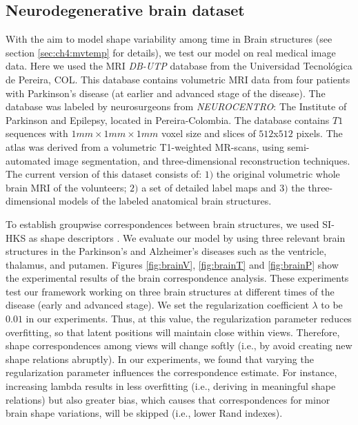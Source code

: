 \documentclass[]{article}
\begin{document}
\subsection{Neurodegenerative brain dataset}


With the aim to model shape variability among time in Brain structures (see section \ref{sec:ch4:mvtemp} for details), we test our model on real medical image data. Here  we used the MRI \textit{DB-UTP} database from the Universidad Tecnol\'ogica de Pereira, COL. This database contains volumetric MRI data from four patients with Parkinson's disease (at earlier and advanced stage of the disease). The database was labeled by neurosurgeons from \textit{NEUROCENTRO}: The Institute of Parkinson and Epilepsy, located in Pereira-Colombia. The database contains $T1$ sequences with $1mm\times1mm\times1mm$ voxel size and slices of $512$x$512$ pixels. The atlas was derived from a volumetric T1-weighted MR-scans, using semi-automated image segmentation, and three-dimensional reconstruction
techniques. The current version of this dataset consists of: $1)$ the original volumetric whole brain MRI of the
volunteers; $2)$ a set of detailed label maps and $3)$ the three-dimensional models of the labeled anatomical brain
structures.

To establish groupwise correspondences between brain structures,  we used SI-HKS as shape descriptors \cite{Bronstein10}. We evaluate our model by using three relevant brain structures in the Parkinson's and Alzheimer's diseases such as the ventricle, thalamus, and putamen. Figures \ref{fig:brainV}, \ref{fig:brainT} and \ref{fig:brainP} show the experimental results of the brain correspondence analysis. These experiments test our framework working on three brain structures at different times of the disease (early and advanced stage). We set the regularization coefficient $\lambda$ to be $0.01$ in our experiments. Thus, at this value, the regularization parameter reduces overfitting, so that latent positions will maintain close within views. Therefore, shape correspondences among views will change softly (i.e., by avoid creating new shape relations abruptly). In our experiments, we found that varying the regularization parameter influences the correspondence estimate. For instance,  increasing lambda results in less overfitting (i.e., deriving in meaningful shape relations) but also greater bias, which causes that correspondences for minor brain shape variations, will be skipped (i.e., lower Rand indexes).
\end{document}
